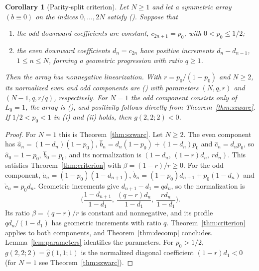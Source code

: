 \documentclass[twoside,10pt]{article}
\numberwithin{equation}{section}
\theoremstyle{slbody}
\newtheorem{corollary}[theorem]{Corollary}
\theoremstyle{definition}
\theoremstyle{remark}
\renewcommand{\eqref}[1]{\textup{{\normalfont(\oldstylenums{\ref{#1}}}\normalfont)}}
\begin{document}
\begin{corollary}[Parity-split criterion]\label{cor:parity}
Let $N\geq1$ and let a symmetric array $(b\equiv0)$ on the indices $0,\ldots,2N$ satisfy \eqref{eq:basic}. Suppose that
\begin{enumerate}
\item the odd downward coefficients are constant, $c_{2n+1}=p_0$, with $0<p_0\leq1/2$;
\item the even downward coefficients $d_n=c_{2n}$ have positive increments $d_n-d_{n-1}$, $1\leq n\leq N$, forming a geometric progression with ratio $q\geq1$.
\end{enumerate}
Then the array has nonnegative linearization. With $r=p_0/(1-p_0)$ and $N\geq2$, its normalized even and odd components are \eqref{eq:parameters} with parameters $(N,q,r)$ and $(N-1,q,r/q)$, respectively. For $N=1$ the odd component consists only of $L_0=1$, the array is \eqref{eq:qarray}, and positivity follows directly from Theorem~\ref{thm:szwarc}. If $1/2<p_0<1$ in (i) and (ii) holds, then $g(2,2;2)<0$.
\end{corollary}
\begin{proof}
For $N=1$ this is Theorem~\ref{thm:szwarc}. Let $N\geq2$. The even component has $\hat a_n=(1-d_n)(1-p_0)$, $\hat b_n=d_n(1-p_0)+(1-d_n)p_0$ and $\hat c_n=d_np_0$, so $\hat a_0=1-p_0$, $\hat b_0=p_0$, and its normalization is $(1-d_n,\,(1-r)d_n,\,rd_n)$. This satisfies Theorem~\ref{thm:criterion} with $\beta=(1-r)/r\geq0$. For the odd component, $\check a_n=(1-p_0)(1-d_{n+1})$, $\check b_n=(1-p_0)d_{n+1}+p_0(1-d_n)$ and $\check c_n=p_0d_n$. Geometric increments give $d_{n+1}-d_1=qd_n$, so the normalization is
\[
\Big(\frac{1-d_{n+1}}{1-d_1},\ \frac{(q-r)d_n}{1-d_1},\ \frac{rd_n}{1-d_1}\Big).
\]
Its ratio $\beta=(q-r)/r$ is constant and nonnegative, and its profile $qd_n/(1-d_1)$ has geometric increments with ratio $q$. Theorem~\ref{thm:criterion} applies to both components, and Theorem~\ref{thm:decomp} concludes. Lemma~\ref{lem:parameters} identifies the parameters. For $p_0>1/2$, $g(2,2;2)=\hat g(1,1;1)$ is the normalized diagonal coefficient $(1-r)d_1<0$ (for $N=1$ see Theorem~\ref{thm:szwarc}).
\end{proof}
\end{document}
